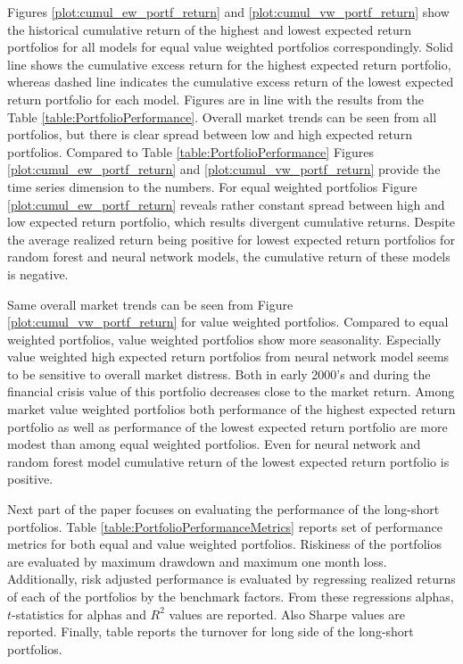 \documentclass{article}
\begin{document}
Figures \ref{plot:cumul_ew_portf_return} and \ref{plot:cumul_vw_portf_return} show the historical cumulative return of the highest and lowest expected return portfolios for all models for equal value weighted portfolios correspondingly. Solid line shows the cumulative excess return for the highest expected return portfolio, whereas dashed line indicates the cumulative excess return of the lowest expected return portfolio for each model. Figures are in line with the results from the Table \ref{table:PortfolioPerformance}. Overall market trends can be seen from all portfolios, but there is clear spread between low and high expected return portfolios. Compared to Table \ref{table:PortfolioPerformance} Figures \ref{plot:cumul_ew_portf_return} and \ref{plot:cumul_vw_portf_return} provide the time series dimension to the numbers. For equal weighted portfolios Figure \ref{plot:cumul_ew_portf_return} reveals rather constant spread between high and low expected return portfolio, which results divergent cumulative returns. Despite the average realized return being positive for lowest expected return portfolios for random forest and neural network models, the cumulative return of these models is negative. \par

Same overall market trends can be seen from Figure \ref{plot:cumul_vw_portf_return} for value weighted portfolios. Compared to equal weighted portfolios, value weighted portfolios show more seasonality. Especially value weighted high expected return portfolios from neural network model seems to be sensitive to overall market distress. Both in early 2000's and during the financial crisis value of this portfolio decreases close to the market return. Among market value weighted portfolios both performance of the highest expected return portfolio as well as performance of the lowest expected return portfolio are more modest than among equal weighted portfolios. Even for neural network and random forest model cumulative return of the lowest expected return portfolio is positive. \par

Next part of the paper focuses on evaluating the performance of the long-short portfolios. Table \ref{table:PortfolioPerformanceMetrics} reports set of performance metrics for both equal and value weighted portfolios. Riskiness of the portfolios are evaluated by maximum drawdown and maximum one month loss. Additionally, risk adjusted performance is evaluated by regressing realized returns of each of the portfolios by the benchmark factors. From these regressions alphas, $t$-statistics for alphas and $R^2$ values are reported. Also Sharpe values are reported. Finally, table reports the turnover for long side of the long-short portfolios. \par
\end{document}
